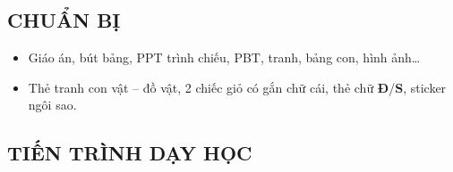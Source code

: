 \documentclass[../main.tex]{subfiles}
\begin{document}
\subsection{CHUẨN BỊ}
\begin{itemize}
    \item[-] Giáo án, bút bảng, PPT trình chiếu, PBT, tranh, bảng con, hình ảnh\dots
    \item[-] Thẻ tranh con vật -- đồ vật, 2 chiếc giỏ có gắn chữ cái, thẻ chữ \textbf{Đ}/\textbf{S}, sticker ngôi sao.
\end{itemize}

\subsection{TIẾN TRÌNH DẠY HỌC}

\end{document}
